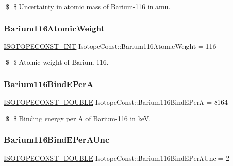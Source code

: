 \$ \$ Uncertainty in atomic mass of Barium-\/116 in amu. \mbox{\label{group___isotope_const-_barium-_ba116_ga41a52e25eb30660d7d1438c1d10fe660}} 
\subsubsection{\texorpdfstring{Barium116\+Atomic\+Weight}{Barium116AtomicWeight}}
{\footnotesize\ttfamily \mbox{\hyperlink{group___isotope_const-_macros_ga5f18360b3e99483a35c32d789e62621c}{I\+S\+O\+T\+O\+P\+E\+C\+O\+N\+S\+T\+\_\+\+I\+NT}} Isotope\+Const\+::\+Barium116\+Atomic\+Weight = 116}

\$ \$ Atomic weight of Barium-\/116. \mbox{\label{group___isotope_const-_barium-_ba116_gac6021136a4481ccaef6eb4630420f0ca}} 
\subsubsection{\texorpdfstring{Barium116\+Bind\+E\+PerA}{Barium116BindEPerA}}
{\footnotesize\ttfamily \mbox{\hyperlink{group___isotope_const-_macros_ga8f45a7272ce02c0b4c65c44636ed719a}{I\+S\+O\+T\+O\+P\+E\+C\+O\+N\+S\+T\+\_\+\+D\+O\+U\+B\+LE}} Isotope\+Const\+::\+Barium116\+Bind\+E\+PerA = 8164}

\$ \$ Binding energy per A of Barium-\/116 in keV. \mbox{\label{group___isotope_const-_barium-_ba116_ga9cc7d99ede7d1b3cd38470f3d1867b1e}} 
\subsubsection{\texorpdfstring{Barium116\+Bind\+E\+Per\+A\+Unc}{Barium116BindEPerAUnc}}
{\footnotesize\ttfamily \mbox{\hyperlink{group___isotope_const-_macros_ga8f45a7272ce02c0b4c65c44636ed719a}{I\+S\+O\+T\+O\+P\+E\+C\+O\+N\+S\+T\+\_\+\+D\+O\+U\+B\+LE}} Isotope\+Const\+::\+Barium116\+Bind\+E\+Per\+A\+Unc = 2}

